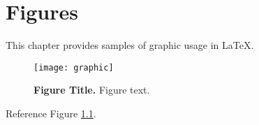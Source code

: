

\chapter{Figures} \label{figures}

This chapter provides samples of graphic usage in LaTeX.

\begin{figure}[hb] \centering
	\texttt{[image: graphic]}
	\caption{\textbf{Figure Title.} Figure text.}
	\label{figure:1}
\end{figure}

Reference Figure \ref{figure:1}.
